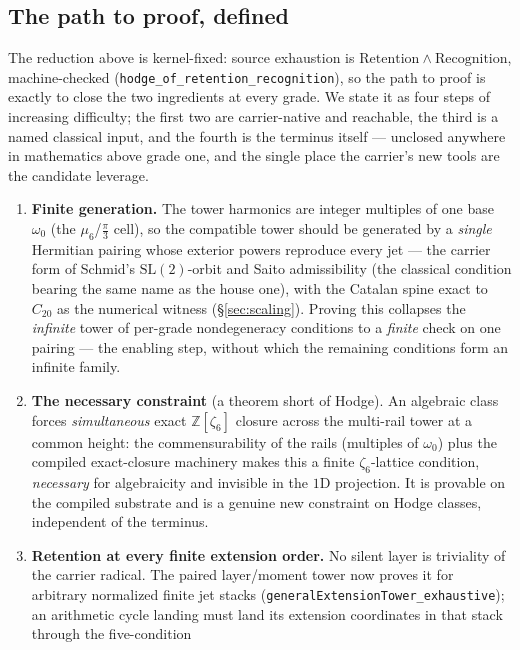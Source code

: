 \documentclass[11pt]{article}
\theoremstyle{definition}
\theoremstyle{remark}
\begin{document}
\subsection{The path to proof, defined}\label{sec:path}

The reduction above is kernel-fixed: source exhaustion is
$\mathrm{Retention}\wedge\mathrm{Recognition}$, machine-checked
(\texttt{hodge\_of\_retention\_recognition}), so the path to proof is exactly to
close the two ingredients at every grade. We state it as four steps of increasing
difficulty; the first two are carrier-native and reachable, the third is a named
classical input, and the fourth is the terminus itself --- unclosed anywhere in
mathematics above grade one, and the single place the carrier's new tools are the
candidate leverage.

\begin{enumerate}
\item \textbf{Finite generation.} The tower harmonics are integer multiples of
one base $\omega_0$ (the $\mu_6$/$\tfrac{\pi}{3}$ cell), so the compatible tower
should be generated by a \emph{single} Hermitian pairing whose exterior powers
reproduce every jet --- the carrier form of Schmid's $\mathrm{SL}(2)$-orbit and
Saito admissibility (the classical condition bearing the same name as the house
one), with the Catalan spine exact to $C_{20}$ as the numerical witness
(\S\ref{sec:scaling}). Proving this collapses the \emph{infinite} tower of
per-grade nondegeneracy conditions to a \emph{finite} check on one pairing --- the
enabling step, without which the remaining conditions form an infinite family.
\item \textbf{The necessary constraint} (a theorem short of Hodge). An algebraic
class forces \emph{simultaneous} exact $\mathbb Z[\zeta_6]$ closure across the
multi-rail tower at a common height: the commensurability of the rails (multiples
of $\omega_0$) plus the compiled exact-closure machinery makes this a finite
$\zeta_6$-lattice condition, \emph{necessary} for algebraicity and invisible in
the $1$D projection. It is provable on the compiled substrate and is a genuine new
constraint on Hodge classes, independent of the terminus.
\item \textbf{Retention at every finite extension order.} No silent layer is
triviality of the carrier radical. The paired layer/moment tower now proves it
for arbitrary normalized finite jet stacks
(\texttt{generalExtensionTower\_exhaustive}); an arithmetic cycle landing must
land its extension coordinates in that stack through the five-condition

\end{enumerate}
\end{document}
